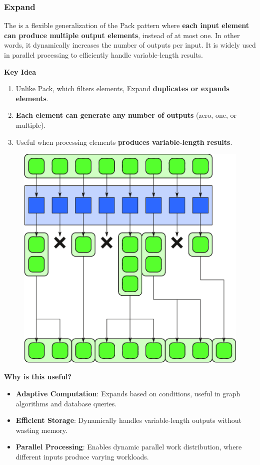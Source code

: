\subsubsection{Expand}

The  is a flexible generalization of the Pack pattern where \textbf{each input element can produce multiple output elements}, instead of at most one. In other words, it dynamically increases the number of outputs per input. It is widely used in parallel processing to efficiently handle variable-length results.

\highspace
\begin{flushleft}
    \textcolor{Green3}{ \textbf{Key Idea}}
\end{flushleft}
\begin{enumerate}
    \item Unlike Pack, which filters elements, Expand \textbf{duplicates or expands elements}.
    \item \textbf{Each element can generate any number of outputs} (zero, one, or multiple).
    \item Useful when processing elements \textbf{produces variable-length results}.
\end{enumerate}

\begin{figure}[!htp]
    \centering
    \includegraphics[width=.6\textwidth]{img/expand-1.pdf}
\end{figure}

\begin{flushleft}
    \textcolor{Green3}{ \textbf{Why is this useful?}}
\end{flushleft}
\begin{itemize}
    \item \textbf{Adaptive Computation}: Expands based on conditions, useful in graph algorithms and database queries.
    \item \textbf{Efficient Storage}: Dynamically handles variable-length outputs without wasting memory.
    \item \textbf{Parallel Processing}: Enables dynamic parallel work distribution, where different inputs produce varying workloads.
\end{itemize}